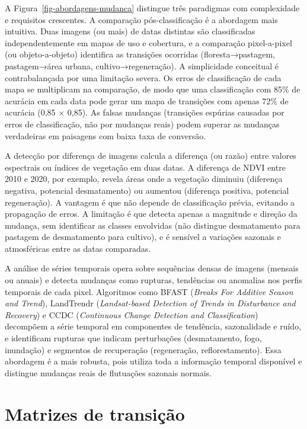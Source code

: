 \documentclass[
  portuguese,
  11pt,
  a4paper,
  open=any]{scrbook}
\begin{document}
A Figura~\ref{fig-abordagens-mudanca} distingue três paradigmas com
complexidade e requisitos crescentes. A comparação pós-classificação é a
abordagem mais intuitiva. Duas imagens (ou mais) de datas distintas são
classificadas independentemente em mapas de uso e cobertura, e a
comparação pixel-a-pixel (ou objeto-a-objeto) identifica as transições
ocorridas (floresta→pastagem, pastagem→área urbana,
cultivo→regeneração). A simplicidade conceitual é contrabalançada por
uma limitação severa. Os erros de classificação de cada mapa se
multiplicam na comparação, de modo que uma classificação com 85\% de
acurácia em cada data pode gerar um mapa de transições com apenas 72\%
de acurácia (0,85 × 0,85). As falsas mudanças (transições espúrias
causadas por erros de classificação, não por mudanças reais) podem
superar as mudanças verdadeiras em paisagens com baixa taxa de
conversão.

A detecção por diferença de imagens calcula a diferença (ou razão) entre
valores espectrais ou índices de vegetação em duas datas. A diferença de
NDVI entre 2010 e 2020, por exemplo, revela áreas onde a vegetação
diminuiu (diferença negativa, potencial desmatamento) ou aumentou
(diferença positiva, potencial regeneração). A vantagem é que não
depende de classificação prévia, evitando a propagação de erros. A
limitação é que detecta apenas a magnitude e direção da mudança, sem
identificar as classes envolvidas (não distingue desmatamento para
pastagem de desmatamento para cultivo), e é sensível a variações
sazonais e atmosféricas entre as datas comparadas.

A análise de séries temporais opera sobre sequências densas de imagens
(mensais ou anuais) e detecta mudanças como rupturas, tendências ou
anomalias nos perfis temporais de cada pixel. Algoritmos como BFAST
(\emph{Breaks For Additive Season and Trend}), LandTrendr
(\emph{Landsat-based Detection of Trends in Disturbance and Recovery}) e
CCDC (\emph{Continuous Change Detection and Classification}) decompõem a
série temporal em componentes de tendência, sazonalidade e ruído, e
identificam rupturas que indicam perturbações (desmatamento, fogo,
inundação) e segmentos de recuperação (regeneração, reflorestamento).
Essa abordagem é a mais robusta, pois utiliza toda a informação temporal
disponível e distingue mudanças reais de flutuações sazonais normais.

\section{Matrizes de transição}\label{matrizes-de-transiuxe7uxe3o}
\end{document}
